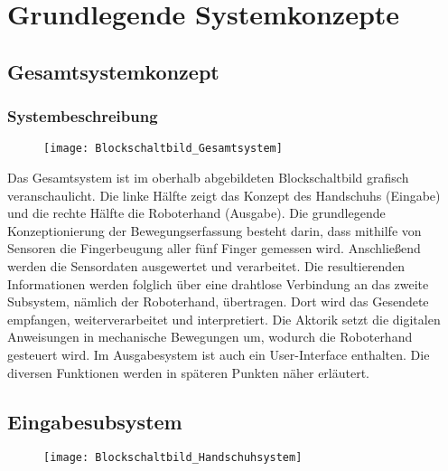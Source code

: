 \documentclass[titlepage,12pt,twoside]{article}
\begin{document}

\section{Grundlegende Systemkonzepte}

\subsection{Gesamtsystemkonzept}

\subsubsection{Systembeschreibung}

	\begin{figure}[H]
		\begin{center}
			\scalebox{1.2}
			{\texttt{[image: Blockschaltbild\_Gesamtsystem]}}
		\end{center}
	\end{figure}

Das Gesamtsystem ist im oberhalb abgebildeten Blockschaltbild grafisch veranschaulicht. Die linke Hälfte zeigt das Konzept des 
Handschuhs (Eingabe) und die rechte Hälfte die Roboterhand (Ausgabe). Die grundlegende Konzeptionierung der Bewegungserfassung 
besteht darin, dass mithilfe von Sensoren die Fingerbeugung aller fünf Finger gemessen wird. Anschließend werden die Sensordaten
ausgewertet und verarbeitet. Die resultierenden Informationen werden folglich über eine drahtlose Verbindung an das zweite 
Subsystem, nämlich der Roboterhand, übertragen. Dort wird das Gesendete empfangen, weiterverarbeitet und interpretiert. Die Aktorik
setzt die digitalen Anweisungen in mechanische Bewegungen um, wodurch die Roboterhand gesteuert wird. Im Ausgabesystem ist auch 
ein User-Interface enthalten. Die diversen Funktionen werden in späteren Punkten näher erläutert.

\subsection{Eingabesubsystem}

	\begin{figure}[H]
		\begin{center}
			\scalebox{0.8}
			{\texttt{[image: Blockschaltbild\_Handschuhsystem]}}
		\end{center}
	\end{figure}
\end{document}

